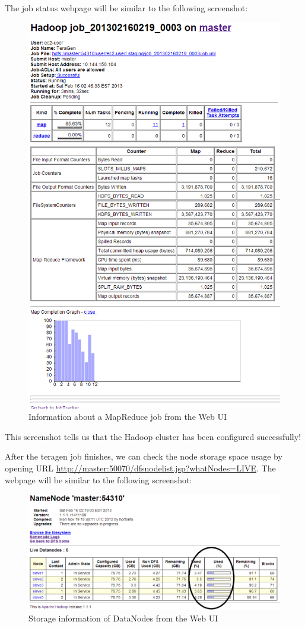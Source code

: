 The job status webpage will be similar to the following screenshot: \\
\begin{figure}[h]
  \centering
  \includegraphics[width=.5\textwidth]{figs/5163os_03_06.png}
  \caption{Information about a MapReduce job from the Web UI}\label{fig:mapreduce.job}
\end{figure} 


This screenshot tells us that the Hadoop cluster has been configured successfully!

After the teragen job finishes, we can check the node storage space usage by opening URL \url{http://master:50070/dfsnodelist.jsp?whatNodes=LIVE}. The webpage will be similar to the following screenshot: \\

\begin{figure}[h]
  \centering
  \includegraphics[width=.8\textwidth]{figs/5163os_03_07.png}
  \caption{Storage information of DataNodes from the Web UI}\label{fig:hdfs.storage}
\end{figure} 

